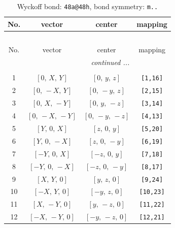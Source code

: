 \documentclass[fleqn,8pt]{jsarticle}
\begin{document}
\begin{longtable}{cccc}
\caption{Wyckoff bond: {\tt 48a@48h}, bond symmetry: {\tt m..}}
 \\
 \hline \hline
No. & vector & center & mapping \\ \hline \endfirsthead

\multicolumn{3}{l}{\tablename\ \thetable{}} \\
 \hline \hline
No. & vector & center & mapping \\ \hline \endhead

 \hline \hline
\multicolumn{3}{r}{\footnotesize\it continued ...} \\ \endfoot

 \hline \hline
\multicolumn{3}{r}{} \\ \endlastfoot

1 & $\left[ 0,\, X,\, Y \right]$ & $\left[ 0,\, y,\, z \right]$ & {\tt [1,16]} \\ \hline
2 & $\left[ 0,\, - X,\, Y \right]$ & $\left[ 0,\, - y,\, z \right]$ & {\tt [2,15]} \\ \hline
3 & $\left[ 0,\, X,\, - Y \right]$ & $\left[ 0,\, y,\, - z \right]$ & {\tt [3,14]} \\ \hline
4 & $\left[ 0,\, - X,\, - Y \right]$ & $\left[ 0,\, - y,\, - z \right]$ & {\tt [4,13]} \\ \hline
5 & $\left[ Y,\, 0,\, X \right]$ & $\left[ z,\, 0,\, y \right]$ & {\tt [5,20]} \\ \hline
6 & $\left[ Y,\, 0,\, - X \right]$ & $\left[ z,\, 0,\, - y \right]$ & {\tt [6,19]} \\ \hline
7 & $\left[ - Y,\, 0,\, X \right]$ & $\left[ - z,\, 0,\, y \right]$ & {\tt [7,18]} \\ \hline
8 & $\left[ - Y,\, 0,\, - X \right]$ & $\left[ - z,\, 0,\, - y \right]$ & {\tt [8,17]} \\ \hline
9 & $\left[ X,\, Y,\, 0 \right]$ & $\left[ y,\, z,\, 0 \right]$ & {\tt [9,24]} \\ \hline
10 & $\left[ - X,\, Y,\, 0 \right]$ & $\left[ - y,\, z,\, 0 \right]$ & {\tt [10,23]} \\ \hline
11 & $\left[ X,\, - Y,\, 0 \right]$ & $\left[ y,\, - z,\, 0 \right]$ & {\tt [11,22]} \\ \hline
12 & $\left[ - X,\, - Y,\, 0 \right]$ & $\left[ - y,\, - z,\, 0 \right]$ & {\tt [12,21]} \\
\end{longtable}
\renewcommand{\arraystretch}{1.2}
\end{document}
